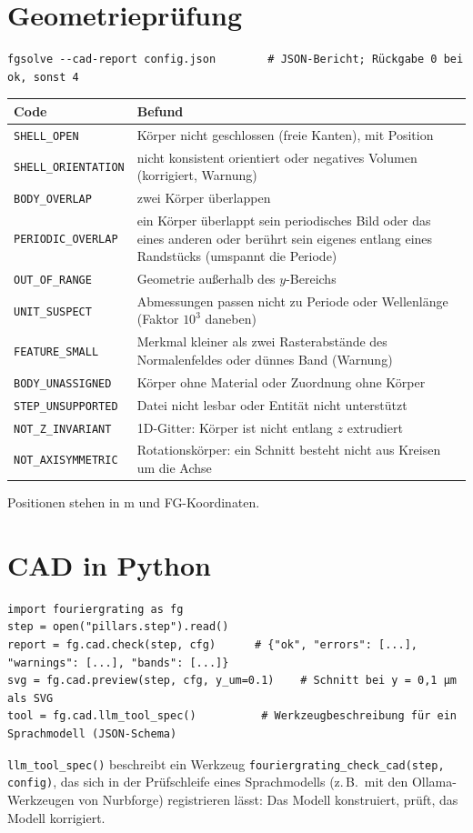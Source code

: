 \section{Geometrieprüfung}
%
\begin{lstlisting}[style=shell]
fgsolve --cad-report config.json        # JSON-Bericht; Rückgabe 0 bei ok, sonst 4
\end{lstlisting}
\begin{center}
\small
\begin{tabularx}{\linewidth}{lY}
\toprule
Code & Befund \\
\midrule
\texttt{SHELL\_OPEN} & Körper nicht geschlossen (freie Kanten), mit Position \\
\texttt{SHELL\_ORIENTATION} & nicht konsistent orientiert oder negatives Volumen (korrigiert, Warnung) \\
\texttt{BODY\_OVERLAP} & zwei Körper überlappen \\
\texttt{PERIODIC\_OVERLAP} & ein Körper überlappt sein periodisches Bild oder das eines anderen oder berührt sein
eigenes entlang eines Randstücks (umspannt die Periode) \\
\texttt{OUT\_OF\_RANGE} & Geometrie außerhalb des $y$-Bereichs \\
\texttt{UNIT\_SUSPECT} & Abmessungen passen nicht zu Periode oder Wellenlänge (Faktor $10^3$ daneben) \\
\texttt{FEATURE\_SMALL} & Merkmal kleiner als zwei Rasterabstände des Normalenfeldes oder dünnes Band (Warnung) \\
\texttt{BODY\_UNASSIGNED} & Körper ohne Material oder Zuordnung ohne Körper \\
\texttt{STEP\_UNSUPPORTED} & Datei nicht lesbar oder Entität nicht unterstützt \\
\texttt{NOT\_Z\_INVARIANT} & 1D-Gitter: Körper ist nicht entlang $z$ extrudiert \\
\texttt{NOT\_AXISYMMETRIC} & Rotationskörper: ein Schnitt besteht nicht aus Kreisen um die Achse \\
\bottomrule
\end{tabularx}
\end{center}
Positionen stehen in \textmu m und FG-Koordinaten.

\section{CAD in Python}
\begin{lstlisting}[style=py]
import fouriergrating as fg
step = open("pillars.step").read()
report = fg.cad.check(step, cfg)      # {"ok", "errors": [...], "warnings": [...], "bands": [...]}
svg = fg.cad.preview(step, cfg, y_um=0.1)    # Schnitt bei y = 0,1 µm als SVG
tool = fg.cad.llm_tool_spec()          # Werkzeugbeschreibung für ein Sprachmodell (JSON-Schema)
\end{lstlisting}
\texttt{llm\_tool\_spec()} beschreibt ein Werkzeug \texttt{fouriergrating\_check\_cad(step, config)}, das sich in
der Prüfschleife eines Sprachmodells (z.\,B.\ mit den Ollama-Werkzeugen von Nurbforge) registrieren lässt: Das Modell
konstruiert, \FG{} prüft, das Modell korrigiert.

